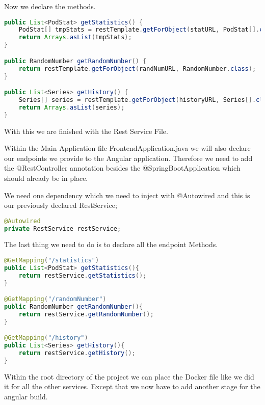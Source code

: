 Now we declare the methods.
\begin{lstlisting}[language=Java]
public List<PodStat> getStatistics() {
	PodStat[] tmpStats = restTemplate.getForObject(statURL, PodStat[].class);
	return Arrays.asList(tmpStats);
}

public RandomNumber getRandomNumber() {
	return restTemplate.getForObject(randNumURL, RandomNumber.class);
}

public List<Series> getHistory() {
	Series[] series = restTemplate.getForObject(historyURL, Series[].class);
	return Arrays.asList(series);
}
\end{lstlisting}

With this we are finished with the Rest Service File.

Within the Main Application file FrontendApplication.java we will also declare our endpoints we provide to the Angular application. Therefore we need to add the @RestController annotation besides the @SpringBootApplication which should already be in place.

We need one dependency which we need to inject with @Autowired and this is our previously declared RestService;
\begin{lstlisting}[language=Java]
@Autowired
private RestService restService;
\end{lstlisting}

The last thing we need to do is to declare all the endpoint Methods.
\begin{lstlisting}[language=Java]
@GetMapping("/statistics")
public List<PodStat> getStatistics(){	
	return restService.getStatistics();
}

@GetMapping("/randomNumber")
public RandomNumber getRandomNumber(){
	return restService.getRandomNumber();
}

@GetMapping("/history")
public List<Series> getHistory(){
	return restService.getHistory();
}
\end{lstlisting}

Within the root directory of the project we can place the Docker file like we did it for all the other services. Except that we now have to add another stage for the angular build.





